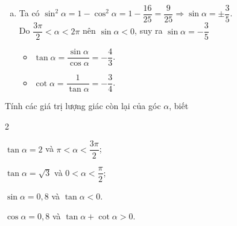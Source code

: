 \begin{vd}
{\begin{enumerate}[a)]
			\item Ta có $\sin^2 \alpha=1-\cos^2\alpha = 1-\dfrac{16}{25}=\dfrac{9}{25} \Rightarrow \sin \alpha = \pm \dfrac{3}{5}$.\\
			Do $\dfrac{3\pi}{2} <\alpha <2\pi$ nên $\sin \alpha <0$, suy ra $\sin \alpha = -\dfrac{3}{5}$
			\begin{itemize}
				\item  $\tan \alpha = \dfrac{\sin \alpha}{\cos \alpha}=-\dfrac{4}{3}$.
				\item  $\cot \alpha = \dfrac{1}{\tan \alpha}=-\dfrac{3}{4}$.
			\end{itemize} 
			
	\end{enumerate}}
\end{vd} %

\begin{vd}
	Tính các giá trị lượng giác còn lại của góc $\alpha$, biết
	\begin{enumEX}{2}
		\item $\tan \alpha =2$ và $\pi <\alpha <\dfrac{3\pi}{2}$;
		\item $\tan \alpha =\sqrt{3}$ và $0<\alpha <\dfrac{\pi}{2} $;
		\item $\sin \alpha =0{,}8$ và $\tan \alpha <0$.
		\item $\cos \alpha =0{,}8$ và $\tan \alpha +\cot \alpha >0$.
	\end{enumEX}
\end{vd}
